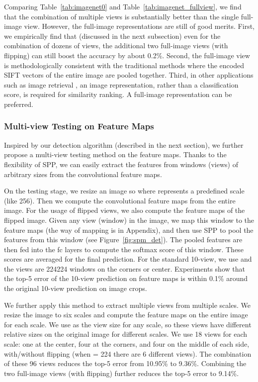 \documentclass[10pt,journal,cspaper,compsoc]{IEEEtran}
\begin{document}
Comparing Table~\ref{tab:imagenet0} and Table~\ref{tab:imagenet_fullview}, we find that the combination of multiple views is substantially better than the single full-image view. However, the full-image representations are still of good merits. First, we empirically find that (discussed in the next subsection) even for the combination of dozens of views, the additional two full-image views (with flipping) can still boost the accuracy by about 0.2\%. Second, the full-image view is methodologically consistent with the traditional methods \cite{Lazebnik2006,Yang2009,Perronnin2010} where the encoded SIFT vectors of the entire image are pooled together. Third, in other applications such as image retrieval \cite{Jegou2012}, an image representation, rather than a classification score, is required for similarity ranking. A full-image representation can be preferred.

\subsubsection{Multi-view Testing on Feature Maps}
\label{subsec:multi_view_testing}

Inspired by our detection algorithm (described in the next section), we further propose a multi-view testing method on the feature maps. Thanks to the flexibility of SPP, we can easily extract the features from windows (views) of arbitrary sizes from the convolutional feature maps.

On the testing stage, we resize an image so  where  represents a predefined scale (like 256). Then we compute the convolutional feature maps from the entire image. For the usage of flipped views, we also compute the feature maps of the flipped image.
Given any view (window) in the image, we map this window to the feature maps (the way of mapping is in Appendix), and then use SPP to pool the features from this window (see Figure~\ref{fig:spm_det}). The pooled features are then fed into the fc layers to compute the softmax score of this window. These scores are averaged for the final prediction. For the standard 10-view, we use  and the views are 224224 windows on the corners or center. Experiments show that the top-5 error of the 10-view prediction on feature maps is within 0.1\% around the original 10-view prediction on image crops.

We further apply this method to extract multiple views from multiple scales. We resize the image to six scales  and compute the feature maps on the entire image for each scale. We use  as the view size for any scale, so these views have different relative sizes on the original image for different scales. We use 18 views for each scale: one at the center, four at the corners, and four on the middle of each side, with/without flipping (when  = 224 there are 6 different views). The combination of these 96 views reduces the top-5 error from 10.95\% to 9.36\%. Combining the two full-image views (with flipping) further reduces the top-5 error to 9.14\%.
\end{document}
